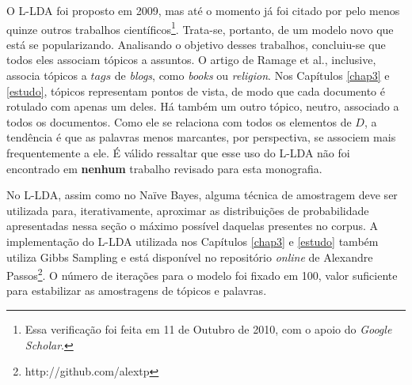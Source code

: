 O L-LDA foi proposto em 2009, mas até o momento já foi citado por pelo menos quinze outros trabalhos científicos\footnote{Essa verificação foi feita em 11 de Outubro de 2010, com o apoio do \emph{Google Scholar}.}. Trata-se, portanto, de um modelo novo que está se popularizando. Analisando o objetivo desses trabalhos, concluiu-se que todos eles associam tópicos a assuntos. O artigo de Ramage et al., inclusive, associa tópicos a \ensuremath{tags} de \emph{blogs}, como \emph{books} ou \emph{religion}. Nos Capítulos \ref{chap3} e \ref{estudo}, tópicos representam pontos de vista, de modo que cada documento é rotulado com apenas um deles. Há também um outro tópico, neutro, associado a todos os documentos. Como ele se relaciona com todos os elementos de \ensuremath{D}, a tendência é que as palavras menos marcantes, por perspectiva, se associem mais frequentemente a ele.  É válido ressaltar que esse uso do L-LDA não foi encontrado em \textbf{nenhum} trabalho revisado para esta monografia. 

No L-LDA, assim como no Naïve Bayes, alguma técnica de amostragem deve ser utilizada para, iterativamente, aproximar as distribuições de probabilidade apresentadas nessa seção o máximo possível daquelas presentes no corpus. A implementação do L-LDA utilizada nos Capítulos \ref{chap3} e \ref{estudo} também utiliza Gibbs Sampling e está disponível no repositório \emph{online} de Alexandre Passos\footnote{http://github.com/alextp}. O número de iterações para o modelo foi fixado em 100, valor suficiente para estabilizar as amostragens de tópicos e palavras.



  

